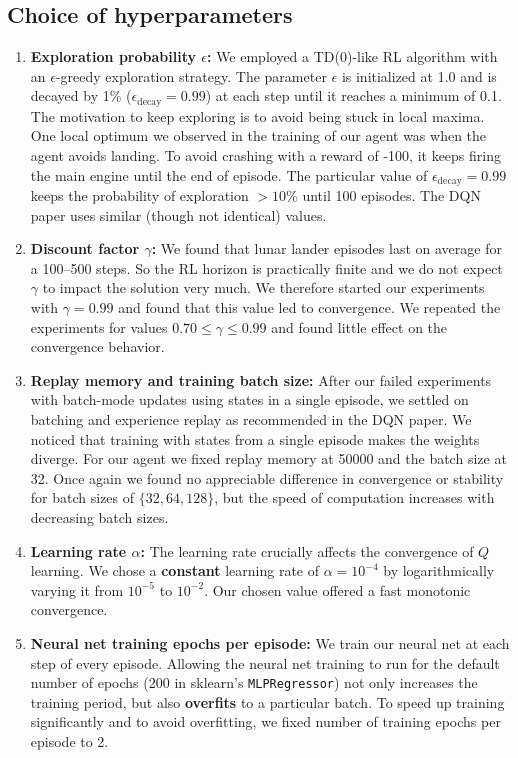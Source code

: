 \documentclass[conference]{IEEEtran}
\begin{document}
\subsection{Choice of hyperparameters}
\begin{enumerate}
\item
{\bf Exploration probability $\epsilon$:} We employed a TD(0)-like RL algorithm with an $\epsilon$-greedy exploration strategy. The parameter $\epsilon$ is initialized at 1.0 and is decayed by 1\% ($\epsilon_{\text{decay}} = 0.99$) at each step until it reaches a minimum of 0.1. The motivation to keep exploring is to avoid being stuck in local maxima. One local optimum we observed in the training of our agent was when the agent avoids landing. To avoid crashing with a reward of -100, it keeps firing the main engine until the end of episode. The particular value of $\epsilon_{\text{decay}} = 0.99$ keeps the probability of exploration $>10\%$ until 100 episodes. The DQN paper uses similar (though not identical) values.

\item
{\bf Discount factor $\gamma$:} We found that lunar lander episodes last on average for a 100--500 steps. So the RL horizon is practically finite and we do not expect $\gamma$ to impact the solution very much. We therefore started our experiments with $\gamma=0.99$ and found that this value led to convergence. We repeated the experiments for values $0.70\leq \gamma \leq 0.99$ and found little effect on the convergence behavior.

\item
{\bf Replay memory and training batch size:} After our failed experiments with batch-mode updates using states in a single episode, we settled on batching and experience replay as recommended in the DQN paper. We noticed that training with states from a single episode makes the weights diverge. For our agent we fixed replay memory at 50000 and the batch size at 32. Once again we found no appreciable difference in convergence or stability for batch sizes of $\{32, 64, 128\}$, but the speed of computation increases with decreasing batch sizes.
 
\item 
{\bf Learning rate $\alpha$:} The learning rate crucially affects the convergence of $Q$ learning. We chose a {\bf constant} learning rate of $\alpha = 10^{-4}$ by logarithmically varying it from $10^{-5}$ to $10^{-2}$. Our chosen value offered a fast monotonic convergence.

\item 
{\bf Neural net training epochs per episode:} We train our neural net at each step of every episode. Allowing the neural net training to run for the default number of  epochs (200 in sklearn's {\tt MLPRegressor}) not only increases the training period, but also {\bf overfits} to a particular batch. To speed up training significantly and to avoid overfitting, we fixed number of training epochs per episode to 2. 
\end{enumerate}
\end{document}
